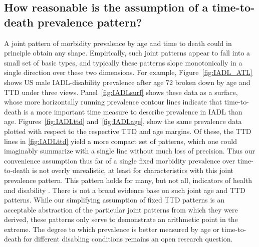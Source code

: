 \documentclass[11pt,oneside,a4paper]{article} %
\begin{document}
\subsection{How reasonable is the assumption of a time-to-death prevalence pattern?}
\label{sec:ttdok}
A joint pattern of morbidity prevalence by age and time to death could in
principle obtain any shape. Empirically, such joint patterns appear to fall into a small set of basic types, and typically these patterns slope monotonically in a single direction over these two dimensions. For example, Figure~\ref{fig:IADL_ATL} shows US male IADL-disability prevalence after age 72 broken down by age and TTD under three views. Panel~\ref{fig:IADLsurf} shows these data as a surface, whose more horizontally running prevalence contour lines indicate that time-to-death is a more important time measure to describe prevalence in IADL than age. Figures~\ref{fig:IADLttd} and~\ref{fig:IADLage}, show the same prevalence data plotted with respect to the respective TTD and age margins. Of these, the TTD lines in \ref{fig:IADLttd} yield a more compact set of patterns, which one could imaginably summarize with a single line without much loss of precision.  Thus our convenience assumption thus far of a single fixed morbidity prevalence over
time-to-death is not overly unrealistic, at least for characteristics with this joint prevalence pattern. This pattern holds for
many, but not all, indicators of health and disability \citep{riffe2015ttd}. There is not a broad evidence base on such joint age and TTD patterns. While our simplifying assumption of fixed TTD patterns is an acceptable abstraction of the particular joint patterns from which they were derived, these patterns only serve to demonstrate an arithmetic point in the extreme. The degree to which prevalence is better measured by age or time-to-death for different disabling conditions remains an open research question.
\end{document}

